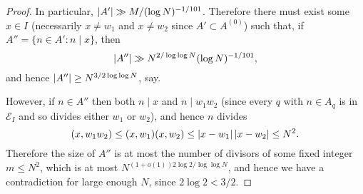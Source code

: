 \begin{proof}
  In particular, $\left\lvert A'\right\rvert\gg M/(\log N)^{-1/101}$. Therefore there must exist some $x\in I$ (necessarily $x\neq w_1$ and $x\neq w_2$ since $A'\subset A^{(0)}$) such that, if $A''=\{ n\in A' : n\mid x\}$, then
  \[\left\lvert A''\right\rvert\gg N^{2/\log\log N}(\log N)^{-1/101},\]
  and hence $\left\lvert A''\right\rvert\geq N^{3/2\log\log N}$, say.

  However, if $n\in A''$ then both $n\mid x$ and $n\mid w_1w_2$ (since every $q$ with $n\in A_q$ is in $\mathcal{E}_I$ and so divides either $w_1$ or $w_2$), and hence $n$ divides
  \[(x,w_1w_2)\leq (x,w_1)(x,w_2)\leq \left\lvert x-w_1\right\rvert\left\lvert x-w_2\right\rvert\leq N^2.\]
  Therefore the size of $A''$ is at most the number of divisors of some fixed integer $m\leq N^2$, which is at most $N^{(1+o(1))2\log 2/\log\log N}$, and hence we have a contradiction for large enough $N$, since $2\log 2< 3/2$.
\end{proof}

